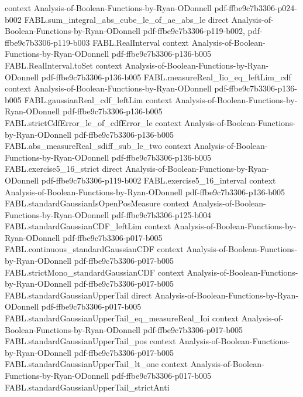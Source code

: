 \begin{theorem}
  {context}
  {Analysis-of-Boolean-Functions-by-Ryan-ODonnell}
  {pdf-ffbe9c7b3306-p024-b002}
\proofstep
  {FABL.sum_integral_abs_cube_le_of_ae_abs_le}
  {direct}
  {Analysis-of-Boolean-Functions-by-Ryan-ODonnell}
  {pdf-ffbe9c7b3306-p119-b002,
    pdf-ffbe9c7b3306-p119-b003}
\proofstep
  {FABL.RealInterval}
  {context}
  {Analysis-of-Boolean-Functions-by-Ryan-ODonnell}
  {pdf-ffbe9c7b3306-p136-b005}
\proofstep
  {FABL.RealInterval.toSet}
  {context}
  {Analysis-of-Boolean-Functions-by-Ryan-ODonnell}
  {pdf-ffbe9c7b3306-p136-b005}
\proofstep
  {FABL.measureReal_Iio_eq_leftLim_cdf}
  {context}
  {Analysis-of-Boolean-Functions-by-Ryan-ODonnell}
  {pdf-ffbe9c7b3306-p136-b005}
\proofstep
  {FABL.gaussianReal_cdf_leftLim}
  {context}
  {Analysis-of-Boolean-Functions-by-Ryan-ODonnell}
  {pdf-ffbe9c7b3306-p136-b005}
\proofstep
  {FABL.strictCdfError_le_of_cdfError_le}
  {context}
  {Analysis-of-Boolean-Functions-by-Ryan-ODonnell}
  {pdf-ffbe9c7b3306-p136-b005}
\proofstep
  {FABL.abs_measureReal_sdiff_sub_le_two}
  {context}
  {Analysis-of-Boolean-Functions-by-Ryan-ODonnell}
  {pdf-ffbe9c7b3306-p136-b005}
\proofstep
  {FABL.exercise5_16_strict}
  {direct}
  {Analysis-of-Boolean-Functions-by-Ryan-ODonnell}
  {pdf-ffbe9c7b3306-p119-b002}
\proofstep
  {FABL.exercise5_16_interval}
  {context}
  {Analysis-of-Boolean-Functions-by-Ryan-ODonnell}
  {pdf-ffbe9c7b3306-p136-b005}
\proofstep
  {FABL.standardGaussianIsOpenPosMeasure}
  {context}
  {Analysis-of-Boolean-Functions-by-Ryan-ODonnell}
  {pdf-ffbe9c7b3306-p125-b004}
\proofstep
  {FABL.standardGaussianCDF_leftLim}
  {context}
  {Analysis-of-Boolean-Functions-by-Ryan-ODonnell}
  {pdf-ffbe9c7b3306-p017-b005}
\proofstep
  {FABL.continuous_standardGaussianCDF}
  {context}
  {Analysis-of-Boolean-Functions-by-Ryan-ODonnell}
  {pdf-ffbe9c7b3306-p017-b005}
\proofstep
  {FABL.strictMono_standardGaussianCDF}
  {context}
  {Analysis-of-Boolean-Functions-by-Ryan-ODonnell}
  {pdf-ffbe9c7b3306-p017-b005}
\proofstep
  {FABL.standardGaussianUpperTail}
  {direct}
  {Analysis-of-Boolean-Functions-by-Ryan-ODonnell}
  {pdf-ffbe9c7b3306-p017-b005}
\proofstep
  {FABL.standardGaussianUpperTail_eq_measureReal_Ioi}
  {context}
  {Analysis-of-Boolean-Functions-by-Ryan-ODonnell}
  {pdf-ffbe9c7b3306-p017-b005}
\proofstep
  {FABL.standardGaussianUpperTail_pos}
  {context}
  {Analysis-of-Boolean-Functions-by-Ryan-ODonnell}
  {pdf-ffbe9c7b3306-p017-b005}
\proofstep
  {FABL.standardGaussianUpperTail_lt_one}
  {context}
  {Analysis-of-Boolean-Functions-by-Ryan-ODonnell}
  {pdf-ffbe9c7b3306-p017-b005}
\proofstep
  {FABL.standardGaussianUpperTail_strictAnti}

\end{theorem}
